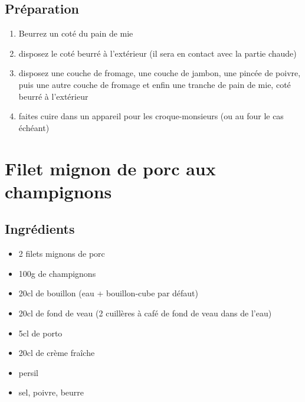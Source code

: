 \subsection*{Préparation}
\begin{enumerate}
\item Beurrez un coté du pain de mie
\item disposez le coté beurré à l'extérieur (il sera en contact avec la partie chaude)
\item disposez une couche de fromage, une couche de jambon, une pincée de poivre, puis une autre couche de fromage et enfin une tranche de pain de mie, coté beurré à l'extérieur
\item faites cuire dans un appareil pour les croque-monsieurs (ou au four le cas échéant)
\end{enumerate}

\newpage
\section{Filet mignon de porc aux champignons}
\subsection*{Ingrédients}
\begin{itemize}
\item 2 filets mignons de porc
\item 100g de champignons
\item 20cl de bouillon (eau + bouillon-cube par défaut)
\item 20cl de fond de veau (2 cuillères à café de fond de veau dans de l'eau)
\item 5cl de porto
\item 20cl de crème fraîche
\item persil
\item sel, poivre, beurre
\end{itemize}

